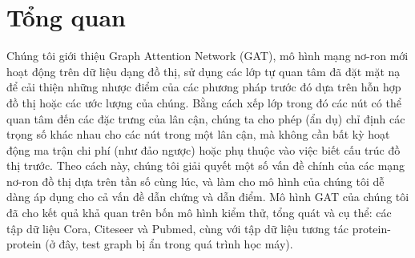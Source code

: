 \chapter*{Tổng quan}

Chúng tôi giới thiệu Graph Attention Network (GAT), mô hình mạng nơ-ron mới hoạt động trên dữ liệu dạng đồ thị, sử dụng các lớp tự quan tâm đã đặt mặt nạ để cải thiện những nhược điểm của các phương pháp trước đó dựa trên hỗn hợp đồ thị hoặc các ước lượng của chúng. 
Bằng cách xếp lớp trong đó các nút có thể quan tâm đến các đặc trưng của lân cận, chúng ta cho phép (ẩn dụ) chỉ định các trọng số khác nhau cho các nút trong một lân cận, mà không cần bất kỳ hoạt động ma trận chi phí (như đảo ngược) hoặc phụ thuộc vào việc biết cấu trúc đồ thị trước.
Theo cách này, chúng tôi giải quyết một số vấn đề chính của các mạng nơ-ron đồ thị dựa trên tần số cùng lúc, và làm cho mô hình của chúng tôi dễ dàng áp dụng cho cả vấn đề dẫn chứng và dẫn điểm. Mô hình GAT của chúng tôi đã cho kết quả khả quan trên bốn mô hình kiểm thử, tổng quát và cụ thể: các tập dữ liệu Cora, Citeseer và Pubmed, cùng với tập dữ liệu tương tác protein-protein (ở đây, test graph bị ẩn trong quá trình học máy).
\vspace{8pt}

